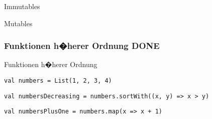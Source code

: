 \documentclass[14pt,aspectratio=169,trans]{beamer} %
\begin{document}
\begin{frame}[plain]
\begin{block}{Immutables}
   \begin{centering} 
     \par
   \end{centering}
	\end{block}
\end{frame} 


\begin{frame}[plain]
\begin{block}{Mutables}
   \begin{centering} 
     \par
   \end{centering}
	\end{block}
	\note{
	}
\end{frame} 


\subsubsection*{Funktionen h�herer Ordnung DONE}

\begin{frame}[fragile]{}
 \begin{block}{Funktionen h�herer Ordnung}
\scriptsize
	\onslide<2->
  \begin{lstlisting}
val numbers = List(1, 2, 3, 4)

	\end{lstlisting}
  \begin{lstlisting}[firstnumber = 2]
val numbersDecreasing = numbers.sortWith((x, y) => x > y)	
\end{lstlisting}
  \begin{lstlisting}[firstnumber = 3]
val numbersPlusOne = numbers.map(x => x + 1)
\end{lstlisting}
\end{block}
\end{frame}
\end{document}
